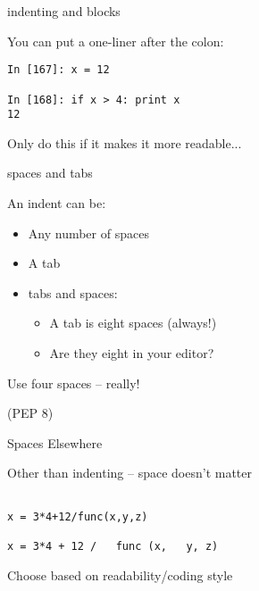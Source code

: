 \documentclass{beamer}
\begin{document}
\begin{frame}[fragile]{indenting and blocks}

{\Large  You can put a one-liner after the colon:}

\vfill
\begin{verbatim}
In [167]: x = 12

In [168]: if x > 4: print x
12
\end{verbatim}

\vfill
{\Large Only do this if it makes it more readable...}

\end{frame}


\begin{frame}{spaces and tabs}

{\Large  An indent can be:}
\begin{itemize}
  \item Any number of spaces
  \item A tab
  \item tabs and spaces:
    \begin{itemize}
      \item A tab is eight spaces (always!)
      \item Are they eight in your editor?
    \end{itemize}
\end{itemize}

\vfill
{\LARGE Use four spaces -- really!}

\vfill
(PEP 8)

\end{frame}


\begin{frame}[fragile]{Spaces Elsewhere}

{\Large  Other than indenting -- space doesn't matter}

\vfill
\begin{verbatim}

x = 3*4+12/func(x,y,z)

x = 3*4 + 12 /   func (x,   y, z) 

\end{verbatim}

\vfill
{\Large Choose based on readability/coding style}

\vfill
{}

\end{frame}
\end{document}
